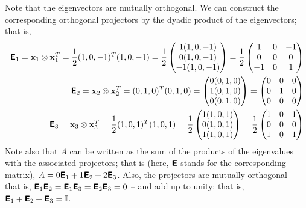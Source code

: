 {Note that the eigenvectors are mutually orthogonal.
We can construct the corresponding orthogonal projectors by the dyadic product
of the eigenvectors; that is,
\begin{equation}
\begin{split}
\textsf{\textbf{E}}_1 =
{\bf x}_1 \otimes {\bf x}_1^T =
\frac{1}{2} (1,0,-1)^T(1,0,-1) =
\frac{1}{2}
\begin{pmatrix}
1(1,0,-1)\\
0(1,0,-1)\\
-1(1,0,-1)
\end{pmatrix} =
\frac{1}{2}
\begin{pmatrix}
1&0&-1\\
0&0&0\\
-1&0&1
\end{pmatrix}
\\
\textsf{\textbf{E}}_{2} =
{\bf x}_{2} \otimes {\bf x}_{2}^T =
 (0,1,0)^T(0,1,0) =
\begin{pmatrix}
0(0,1,0)\\
1(0,1,0)\\
0(0,1,0)
\end{pmatrix} =
\begin{pmatrix}
0&0&0\\
0&1&0\\
0&0&0
\end{pmatrix}
\\
\textsf{\textbf{E}}_{3} =
{\bf x}_{3} \otimes {\bf x}_{3}^T =
\frac{1}{2} (1,0,1)^T(1,0,1) =
\frac{1}{2}
\begin{pmatrix}
1(1,0,1)\\
0(1,0,1)\\
1(1,0,1)
\end{pmatrix} =
\frac{1}{2}
\begin{pmatrix}
1&0&1\\
0&0&0\\
1&0&1
\end{pmatrix}
\end{split}
\end{equation}
Note also that $A$ can be written as the sum of the products of the
eigenvalues with the associated projectors; that is (here, $\textsf{\textbf{E}}$
stands for the corresponding matrix),
$A= 0  \textsf{\textbf{E}}_1 + 1  \textsf{\textbf{E}}_{2} +2\textsf{\textbf{E}}_{3} $.
Also, the projectors are mutually orthogonal
-- that is,
$\textsf{\textbf{E}}_1 \textsf{\textbf{E}}_2 = \textsf{\textbf{E}}_1\textsf{\textbf{E}}_3=\textsf{\textbf{E}}_2\textsf{\textbf{E}}_3=0$
--
and add up to unity; that is,
$\textsf{\textbf{E}}_1+\textsf{\textbf{E}}_2+\textsf{\textbf{E}}_3={\Bbb I}$.
{\textrm{\eexample}}
}


